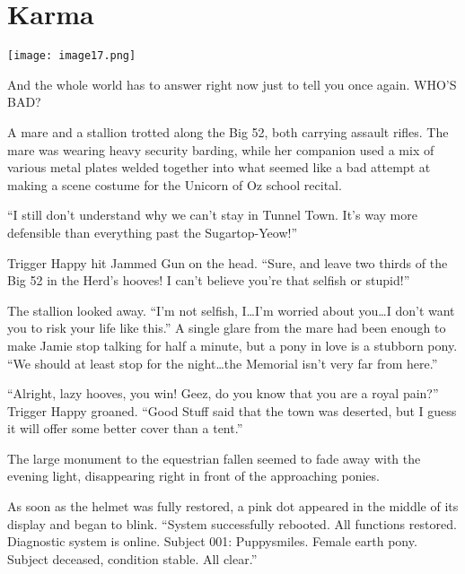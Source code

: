\chapter{Karma}

\texttt{[image: image17.png]}

\begin{intro}
    And the whole world has to answer right now just to tell you once again. WHO'S BAD?
\end{intro}


A mare and a stallion trotted along the Big 52, both carrying assault rifles. The mare was wearing heavy security barding, while her companion used a mix of various metal plates welded together into what seemed like a bad attempt at making a scene costume for the Unicorn of Oz school recital.

``I still don't understand why we can't stay in Tunnel Town. It's way more defensible than everything past the Sugartop-Yeow!''

Trigger Happy hit Jammed Gun on the head. ``Sure, and leave two thirds of the Big 52 in the Herd's hooves! I can't believe you're that selfish or stupid!''

The stallion looked away. ``I'm not selfish, I\dots I'm worried about you\dots I don't want you to risk your life like this.'' A single glare from the mare had been enough to make Jamie stop talking for half a minute, but a pony in love is a stubborn pony. ``We should at least stop for the night\dots the Memorial isn't very far from here.''

``Alright, lazy hooves, you win! Geez, do you know that you are a royal pain?'' Trigger Happy groaned. ``Good Stuff said that the town was deserted, but I guess it will offer some better cover than a tent.''

The large monument to the equestrian fallen seemed to fade away with the evening light, disappearing right in front of the approaching ponies.

\horizonline


As soon as the helmet was fully restored, a pink dot appeared in the middle of its display and began to blink. ``{\mt System successfully rebooted. All functions restored. Diagnostic system is online. Subject 001: Puppysmiles. Female earth pony. Subject deceased, condition stable. All clear.}''

